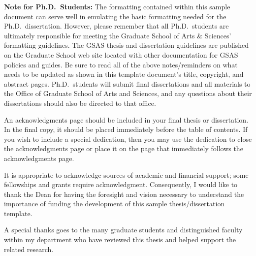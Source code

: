 \begin{thesisabstract}
\textbf{Note for Ph.D.\ Students:}
The formatting contained within this sample document can serve well in
emulating the basic formatting needed for the Ph.D.\ dissertation.   However,
please remember that all Ph.D.\ students are ultimately responsible for meeting
the Graduate School of Arts \& Sciences' formatting guidelines.  The GSAS
thesis and dissertation guidelines are published on the Graduate School web
site located with other documentation for GSAS policies and guides.  Be sure to
read all of the above notes/reminders on what needs to be updated as shown in
this template document's title, copyright, and abstract pages.  Ph.D.\ students
will submit final dissertations and all materials to the Office of Graduate
School of Arts and Sciences, and any questions about their dissertations should
also be directed to that office.
\end{thesisabstract}

\iffalse
\renewcommand{\thesisacknowledgmentpostscript}{
\textbf{Reminders of what needs to be updated:}
After removing these comments, use the above format to help input your
acknowledgments page.   A special dedication can be placed as the final
paragraph, as shown above; alternatively, you may include a special dedication
on the page that follows, as also shown in this sample template.}
\fi

\begin{thesisacknowledgments}
An acknowledgments page should be included in your final thesis or
dissertation.  In the final copy, it should be placed immediately before the
table of contents.  If you wish to include a special dedication, then you may
use the dedication to close the acknowledgments page or place it on the page
that immediately follows the acknowledgments page.  

It is appropriate to acknowledge sources of academic and financial support;
some fellowships and grants require acknowledgment.  Consequently, I would like
to thank the Dean for having the foresight and vision necessary to understand
the importance of funding the development of this sample thesis/dissertation
template.

A special thanks goes to the many graduate students and distinguished faculty
within my department who have reviewed this thesis and helped support the
related research.
\end{thesisacknowledgments}

\begin{thesisdedicationpage}                %
\iffalse
\textbf{Note:} You may include a special dedication as shown here.  If you
include this page, be sure to keep it brief and center it on the page both
horizontally and vertically.  Alternatively, you may remove this page
altogether, and a special dedication can be placed as the final paragraph to
your acknowledgments page (as shown in this document on the preceding page).
\fi
\end{thesisdedicationpage}


